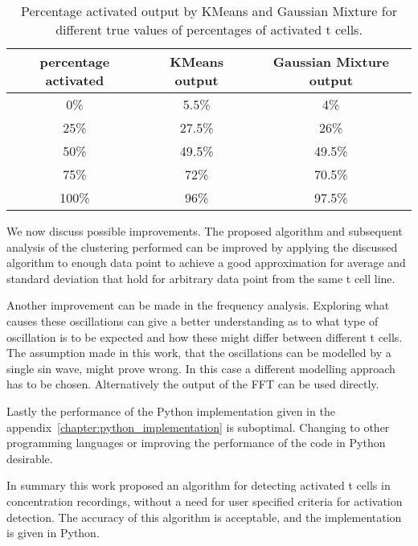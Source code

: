 \begin{table}[h]
	\centering
	\begin{tabular}{|c|c|c|}
		\hline
		percentage activated & KMeans output & Gaussian Mixture output\\
		\hline
		0\% & 5.5\% & 4\%\\
		\hline
		25\% & 27.5\% & 26\%\\
		\hline
		50\% & 49.5\% & 49.5\%\\
		\hline
		75\% & 72\% & 70.5\%\\
		\hline
		100\% & 96\% & 97.5\%\\
		\hline
	\end{tabular}
	\caption{Percentage activated output by KMeans and Gaussian Mixture for different true values of percentages of activated t cells.}
	\label{tab:accuracy}
\end{table}

We now discuss possible improvements. The proposed algorithm and subsequent analysis of the clustering performed can be improved by applying the discussed algorithm to enough data point to achieve a good approximation for average and standard deviation that hold for arbitrary data point from the same t cell line.

Another improvement can be made in the frequency analysis. Exploring what causes these oscillations can give a better understanding as to what type of oscillation is to be expected and how these might differ between different t cells. The assumption made in this work, that the oscillations can be modelled by a single sin wave, might prove wrong. In this case a different modelling approach has to be chosen. Alternatively the output of the FFT can be used directly.

Lastly the performance of the Python implementation given in the appendix~\ref{chapter:python_implementation} is suboptimal. Changing to other programming languages or improving the performance of the code in Python desirable.

In summary this work proposed an algorithm for detecting activated t cells in \Calcium concentration recordings, without a need for user specified criteria for activation detection. The accuracy of this algorithm is acceptable, and the implementation is given in Python.